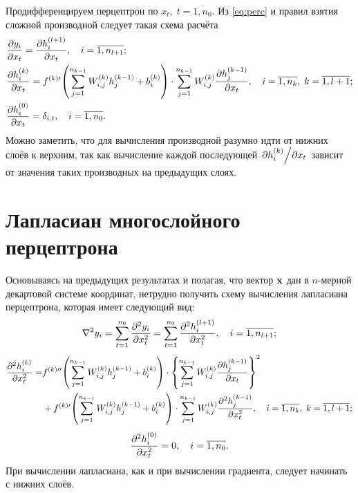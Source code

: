 \documentclass[11pt]{article}
\begin{document}
Продифференцируем перцептрон по $x_t,\; t=\overline{1,n_0}$. Из \eqref{eq:perc} и правил взятия сложной производной следует такая схема расчёта
\begin{equation}
    \begin{split}
        &\pdv{y_i}{x_t} = \pdv{h^{(l+1)}_i}{x_t},\quad i=\overline{1,n_{l+1}};        
        \\
        & \pdv{h^{(k)}_i}{x_t} = f^{(k)\prime}\qty(\sum_{j=1}^{n_{k-1}} W^{(k)}_{i,j} h^{(k-1)}_j + b^{(k)}_i) \cdot \sum_{j=1}^{n_{k-1}} W^{(k)}_{i,j} \pdv{h^{(k-1)}_j}{x_t},\quad i=\overline{1,n_k},\; k = \overline{1, l+1};\\
        & \pdv{h^{(0)}_i}{x_t} = \delta_{i,t},\quad i=\overline{1,n_0}.
    \end{split}
\end{equation}
Можно заметить, что для вычисления производной разумно идти от нижних слоёв к верхним, так как вычисление каждой последующей $\pdv*{h^{(k)}_i}{x_t}$ зависит от значения таких производных на предыдущих слоях.

\section{Лапласиан многослойного перцептрона}

Основываясь на предыдущих результатах и полагая, что вектор $\vb{x}$ дан в $n$-мерной декартовой системе координат, нетрудно получить схему вычисления лапласиана перцептрона, которая имеет следующий вид:
\begin{equation}
    \laplacian y_i = \sum_{t=1}^{n_0} \pdv[2]{y_i}{x_t} = \sum_{t=1}^{n_0}\pdv[2]{h^{(l+1)}_i}{x_t},\quad i=\overline{1,n_{l+1}};
\end{equation}
\begin{equation}
    \begin{split}
        \pdv[2]{h^{(k)}_i}{x_t} = & f^{(k)\prime\prime}\qty(\sum_{j=1}^{n_{k-1}} W^{(k)}_{i,j} h^{(k-1)}_j + b^{(k)}_i) \cdot \qty{\sum_{j=1}^{n_{k-1}} W^{(k)}_{i,j} \pdv{h^{(k-1)}_j}{x_t}}^2\\
        &+ f^{(k)\prime}\qty(\sum_{j=1}^{n_{k-1}} W^{(k)}_{i,j} h^{(k-1)}_j + b^{(k)}_i) \cdot \sum_{j=1}^{n_{k-1}} W^{(k)}_{i,j} \pdv[2]{h^{(k-1)}_j}{x_t},\quad i=\overline{1,n_k},\; k = \overline{1, l+1};
    \end{split}
\end{equation}
\begin{equation}
    \pdv[2]{h^{(0)}_i}{x_t} = 0,\quad i=\overline{1,n_0}.
\end{equation}
При вычислении лапласиана, как и при вычислении градиента, следует начинать с нижних слоёв.
\end{document}
